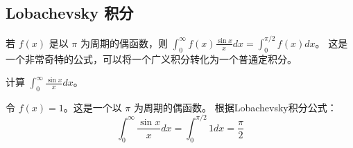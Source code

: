 \documentclass[lang=cn,newtx,10pt,scheme=chinese]{elegantbook}
\begin{document}
\subsection{Lobachevsky 积分}
若 $f(x)$ 是以 $\pi$ 为周期的偶函数，则 $\int_0^\infty f(x) \frac{\sin x}{x} dx = \int_0^{\pi/2} f(x) dx$。
这是一个非常奇特的公式，可以将一个广义积分转化为一个普通定积分。

\begin{problem}
    计算 $\int_0^\infty \frac{\sin x}{x} dx$。
\end{problem}
\begin{solution}
    令 $f(x)=1$。这是一个以 $\pi$ 为周期的偶函数。
    根据Lobachevsky积分公式：
    \begin{equation*}
        \int_0^\infty \frac{\sin x}{x} dx = \int_0^{\pi/2} 1 dx = \frac{\pi}{2}
    \end{equation*}
\end{solution}
\end{document}
